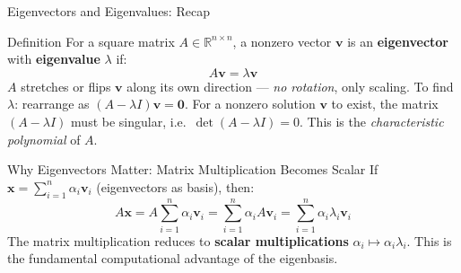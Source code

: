 \documentclass{beamer}
\begin{document}
\begin{frame}[shrink=10]{Eigenvectors and Eigenvalues: Recap}
  \begin{block}{Definition}
    For a square matrix $A \in \mathbb{R}^{n \times n}$, a nonzero
    vector $\mathbf{v}$ is an \textbf{eigenvector} with
    \textbf{eigenvalue} $\lambda$ if:
    \[
      A\mathbf{v} = \lambda\mathbf{v}
    \]
    $A$ stretches or flips $\mathbf{v}$ along its own direction ---
    \emph{no rotation}, only scaling.
    To find $\lambda$: rearrange as $(A - \lambda I)\mathbf{v} = \mathbf{0}$.
    For a nonzero solution $\mathbf{v}$ to exist, the matrix
    $(A-\lambda I)$ must be singular, i.e.\ $\det(A-\lambda I) = 0$.
    This is the \emph{characteristic polynomial} of $A$.
  \end{block}

  \medskip

  \begin{block}{Why Eigenvectors Matter: Matrix Multiplication Becomes Scalar}
    If $\mathbf{x} = \sum_{i=1}^n \alpha_i \mathbf{v}_i$ (eigenvectors
    as basis), then:
    \[
      A\mathbf{x}
        = A\sum_{i=1}^n \alpha_i\mathbf{v}_i
        = \sum_{i=1}^n \alpha_i A\mathbf{v}_i
        = \sum_{i=1}^n \alpha_i \lambda_i \mathbf{v}_i
    \]
    The matrix multiplication reduces to \textbf{scalar multiplications}
    $\alpha_i \mapsto \alpha_i\lambda_i$.
    This is the fundamental computational advantage of the eigenbasis.
  \end{block}
\end{frame}
\end{document}
